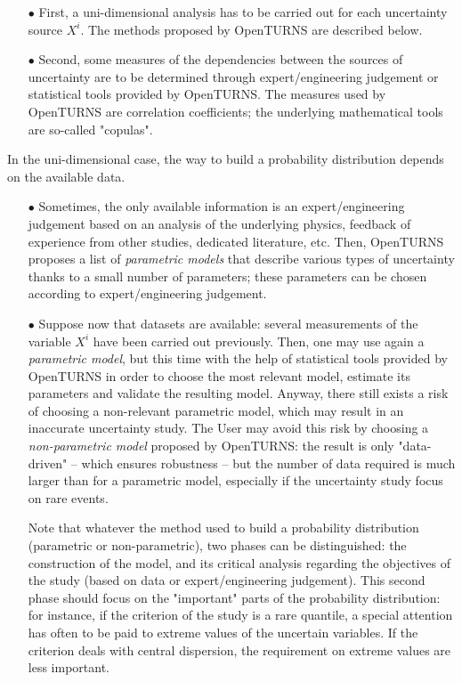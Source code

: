 \begin{itemize}

\item[$\bullet$] First, a uni-dimensional analysis has to be carried out for each uncertainty source $X^i$. The methods proposed by OpenTURNS are described below.

\item[$\bullet$] Second, some measures of the dependencies between the sources of uncertainty are to be determined through expert/engineering judgement or statistical tools provided by OpenTURNS. The measures used by OpenTURNS are correlation coefficients; the underlying mathematical tools are so-called "copulas".

\end{itemize}

In the uni-dimensional case, the way to build a probability distribution depends on the available data.

\begin{itemize}

\item[$\bullet$] Sometimes, the only available information is an expert/engineering judgement based on an analysis of the underlying physics, feedback of experience from other studies, dedicated literature, etc. Then, OpenTURNS proposes a list of {\em parametric models} that describe various types of uncertainty thanks to a small number of parameters; these parameters can be chosen according to expert/engineering judgement.

\item[$\bullet$] Suppose now that datasets are available: several measurements of the variable $X^i$ have been carried out previously. Then, one may use again a {\em parametric model}, but this time with the help of statistical tools provided by OpenTURNS in order to choose the most relevant model, estimate its parameters and validate the resulting model. Anyway, there still exists a risk of choosing a non-relevant parametric model, which may result in an inaccurate uncertainty study. The User may avoid this risk by choosing a  {\em non-parametric model} proposed by OpenTURNS: the result is only "data-driven" -- which ensures robustness -- but the number of data required is much larger than for a parametric model, especially if the uncertainty study focus on rare events.

  Note that whatever the method used to build a probability distribution (parametric or non-parametric), two phases can be distinguished: the construction of the model, and its critical analysis regarding the objectives of the study (based on data or expert/engineering judgement). This second phase should focus on the "important" parts of the probability distribution: for instance, if the criterion of the study is a rare quantile, a special attention has often to be paid to extreme values of the uncertain variables. If the criterion deals with central dispersion, the requirement on extreme values are less important.

\end{itemize}

